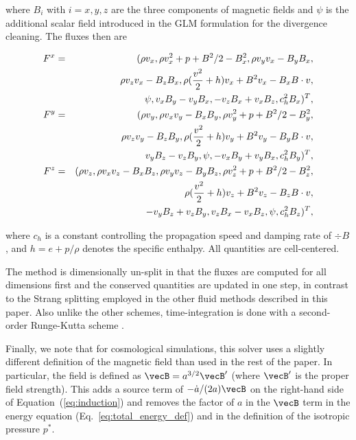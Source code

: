 where $B_i$ with $i={x,y,z}$ are the three components of magnetic
fields and $\psi$ is the additional scalar field introduced in the GLM
formulation for the divergence cleaning.  The fluxes then are

\begin{eqnarray}
 F^x &=& (\rho v_x, \rho v_x^2+p+B^2/2-B_x^2, \rho v_yv_x-B_yB_x, \cr
 && \rho v_zv_x-B_zB_x, \rho ({v^2\over2} + h)v_x+B^2v_x-B_xB\cdot v, \cr
&& \psi, v_xB_y-v_yB_x, -v_zB_x+v_xB_z, c_h^2B_x)^T,\\
 F^y &=& (\rho v_y, \rho v_xv_y-B_xB_y, \rho v_y^2+p+B^2/2-B_y^2, \cr
 && \rho v_zv_y-B_zB_y, \rho ({v^2\over2} + h)v_y+B^2v_y-B_yB\cdot v, \cr
 && v_yB_z-v_zB_y,\psi,-v_xB_y+v_yB_x, c_h^2B_y)^{T}, \\
 F^z &=& (\rho v_z, \rho v_xv_z-B_xB_z, \rho v_yv_z-B_yB_z, \rho v_z^2+p+B^2/2-B_z^2, \cr
 && \rho ({v^2\over2} + h)v_z+B^2v_z-B_zB\cdot v, \cr
    &&  -v_yB_z+v_zB_y, v_zB_x-v_xB_z,\psi, c_h^2B_z)^{T},
\end{eqnarray}

where $c_h$ is a constant controlling the propagation speed and
damping rate of $\div B$, and $h=e+p/\rho$ denotes the specific
enthalpy.  All quantities are cell-centered.

The method is dimensionally un-split in that the fluxes are computed
for all dimensions first and the conserved quantities are updated in
one step, in contrast to the Strang splitting employed in the other
fluid methods described in this paper.  Also unlike the other schemes,
time-integration is done with a second-order Runge-Kutta scheme
\citep{1988JCoPh..77..439S}.

Finally, we note that for cosmological simulations, this solver uses a
slightly different definition of the magnetic field than used in the
rest of the paper.  In particular, the field is defined as $\vecB =
a^{3/2} \vecB^{\prime}$ (where $\vecB^{\prime}$ is the proper field
strength).  This adds a source term of $-\dot{a}/(2a) \vecB$ on the
right-hand side of Equation~(\ref{eq:induction}) and removes the
factor of $a$ in the $\vecB$ term in the energy equation
(Eq.~\ref{eq:total_energy_def}) and in the definition of the isotropic
pressure $p^*$.


